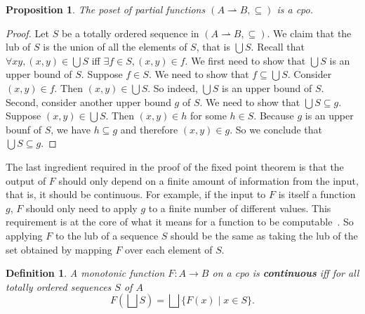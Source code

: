 \documentclass{tufte-handout}
\newcommand{\pto}[0]{\rightharpoonup}
\newtheorem{proposition}[theorem]{Proposition}
\newtheorem{definition}{Definition}%
\begin{document}

\begin{proposition}
  The poset of partial functions $(A\pto B,\subseteq)$ is a
  cpo.
\end{proposition}
\begin{proof}
  Let $S$ be a totally ordered sequence in $(A\pto B,\subseteq)$.  We
  claim that the lub of $S$ is the union of all the elements of
  $S$, that is $\bigcup S$. Recall that $\forall x y, (x,y) \in
  \bigcup S$ iff $\exists f \in S, (x,y) \in f$.
%
  We first need to show that $\bigcup S$ is an upper bound of $S$.
  Suppose $f \in S$. We need to show that $f \subseteq \bigcup S$.
  Consider $(x,y) \in f$. Then $(x,y) \in \bigcup S$. So indeed,
  $\bigcup S$ is an upper bound of $S$.  Second, consider another
  upper bound $g$ of $S$.  We need to show that $\bigcup S \subseteq
  g$. Suppose $(x,y) \in \bigcup S$.  Then $(x,y) \in h$ for some $h
  \in S$. Because $g$ is an upper bounf of $S$, we have $h \subseteq
  g$ and therefore $(x,y) \in g$. So we conclude that $\bigcup S
  \subseteq g$.
\end{proof}

The last ingredient required in the proof of the fixed point theorem
is that the output of $F$ should only depend on a finite amount of
information from the input, that is, it should be continuous. For
example, if the input to $F$ is itself a function $g$, $F$ should only
need to apply $g$ to a finite number of different values.  This
requirement is at the core of what it means for a function to be
computable~\citep{Gunter:1990aa}.  So applying $F$ to the lub of a
sequence $S$ should be the same as taking the lub of the set obtained
by mapping $F$ over each element of $S$.

\begin{definition}
  A monotonic function $F : A {\to} B$ on a cpo is
  \textbf{\emph{continuous}} iff for all totally ordered sequences $S$
  of $A$
  \[
  F(\bigsqcup S) = \bigsqcup \{ F(x) \mid x \in S \}.
  \]
\end{definition}
\end{document}

